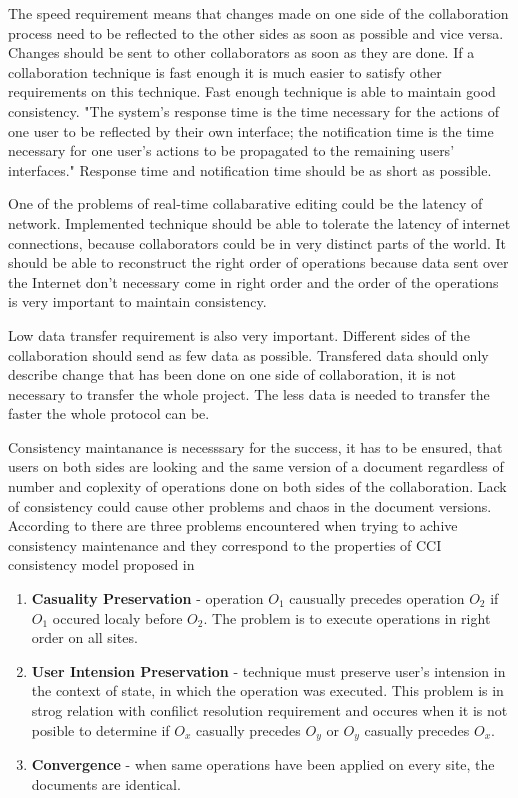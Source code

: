\documentclass[12pt,oneside]{fithesis2}
\begin{document}
\par The speed requirement means that changes made on one side of the collaboration process need to be reflected to the other sides as soon as possible and vice versa. Changes should be sent to other collaborators as soon as they are done. If a collaboration technique is fast enough it is much easier to satisfy other requirements on this technique. Fast enough technique is able to maintain good consistency. "The system’s response time is the time necessary for the actions of one user to be reflected by their own interface; the notification time is the time necessary for one user’s actions to be propagated to the remaining users’ interfaces." \cite{Ellis} Response time and notification time should be as short as possible.  \par One of the problems of real-time collabarative editing could be the latency of network. Implemented technique should be able to tolerate the latency of internet connections, because collaborators could be in very distinct parts of the world. It should be able to reconstruct the right order of operations because data sent over the Internet don't necessary come in right order and the order of the operations is very important to maintain consistency.\par Low data transfer requirement is also very important. Different sides of the collaboration should send as few data as possible. Transfered data should only describe change that has been done on one side of collaboration, it is not necessary to transfer the whole project. The less data is needed to transfer the faster the whole protocol can be.  \par Consistency maintanance is necesssary for the success, it has to be ensured, that users on both sides are looking and the same version of a document regardless of number and coplexity of operations done on both sides of the collaboration. Lack of consistency could cause other problems and chaos in the document versions. According to \cite{Vidot} there are three problems encountered when trying to achive consistency maintenance and they correspond to the properties of CCI consistency model proposed in \cite{Sun}
\begin{enumerate}
\item \textbf{Casuality Preservation} - operation \(O_{1}\) causually precedes operation \(O_{2}\) if \(O_{1}\) occured localy before \(O_{2}\). The problem is to execute operations in right order on all sites.
\item \textbf{User Intension Preservation} - technique must preserve user's intension in the context of state, in which the operation was executed. This problem is in strog relation with confilict resolution requirement and occures when it is not posible to determine if \(O_{x}\) casually precedes \(O_{y}\) or \(O_{y}\) casually precedes \(O_{x}\).
\item \textbf{Convergence} - when same operations have been applied on every site, the documents are identical.
\end{enumerate}
\end{document}

